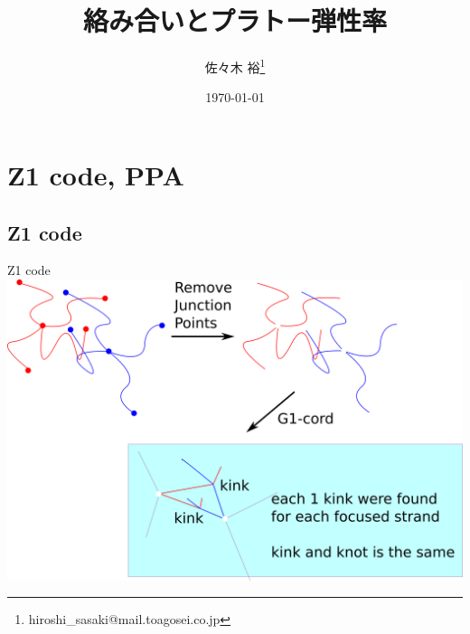 \documentclass[12pt, dvipdfmx]{beamer}
\title{絡み合いとプラトー弾性率}
\author[東亞合成 佐々木]{佐々木 裕\thanks{hiroshi\_sasaki@mail.toagosei.co.jp}}
\institute[東亞合成]{東亞合成株式会社}
\date{\today}
\begin{document}
\maketitle

\section{Z1 code, PPA}
\subsection{Z1 code}
\begin{frame}{Z1 code}
    \centering
        \includegraphics[width=.95\textwidth]{z1cord.png}
\end{frame} 
\end{document}

